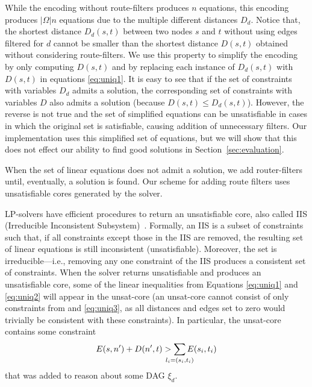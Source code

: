While the encoding without route-filters produces $n$ equations, this
encoding produces $|\Omega|n$ equations due to the multiple different distances
$D_d$.  Notice that, the shortest distance $D_d(s,t)$ between two
nodes $s$ and $t$ without using edges filtered for $d$ cannot be
smaller than the shortest distance $D(s,t)$ obtained without
considering route-filters.  
We use this property to simplify the
encoding by only computing $D(s,t)$ and by replacing each instance of
$D_d(s,t)$ with $D(s,t)$ in equations \eqref{eq:uniq1}.  It is easy to see that 
if the set of constraints with variables $D_d$ admits a solution,
the corresponding set of constraints with variables $D$ 
also admits a solution (because $D(s,t)\leq
D_d(s,t)$).  However, the reverse is not true and the set of
simplified equations can be unsatisfiable in cases in which the
original set is satisfiable, causing addition of unnecessary filters.
Our implementation uses this simplified set of equations, but we will
show that this does not effect our ability to find good solutions in
Section~\ref{sec:evaluation}.


When the set of linear equations does not admit a solution, we 
add router-filters until, eventually, a solution is found.
Our scheme for adding route filters
uses unsatisfiable cores generated
by the solver.

LP-solvers have efficient procedures to return an
unsatisfiable core, also called IIS (Irreducible Inconsistent Subsystem)~\cite{chinneck2007feasibility}. 
Formally, an IIS is a subset of constraints such that,
if all constraints except those in the IIS are removed, the resulting set of
linear equations is still inconsistent (unsatisfiable). Moreover, the set is irreducible---i.e., removing 
any one constraint of the IIS produces a consistent set of constraints. 
When the solver returns unsatisfiable and produces
an unsatisfiable core,
some of the linear inequalities from 
Equations \eqref{eq:uniq1} and  \eqref{eq:uniq2}
will appear in the unsat-core 
(an unsat-core cannot consist of only 
constraints from  and \eqref{eq:uniq3}, as all distances and edges set to zero
would trivially be consistent with these constraints). 
In particular, the unsat-core contains some constraint
\begin{eqnarray}
E(s, n') + D(n', t) > \sum_{\mathclap{\substack{l_i=(s_i,t_i)}}} 
		E(s_i, t_i) 
\end{eqnarray}
that was added to reason about some DAG $\xi_d$.

